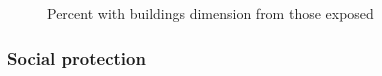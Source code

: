\documentclass[
  letterpaper,
  DIV=11,
  numbers=noendperiod]{scrartcl}
\begin{document}
\begin{figure}[H]


\caption{\label{fig-buildings}Percent with buildings dimension from
those exposed}

\end{figure}%

\subsubsection{Social protection}\label{social-protection-1}
\end{document}
